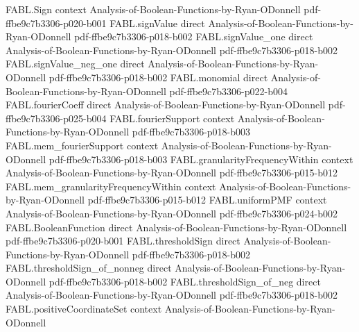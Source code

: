 \begin{theorem}
\label{FABL.coordinateResamplingNoisePMF_eq_coordinateNoisePMF}
\leanok
{}
\proofstep
  {FABL.Sign}
  {context}
  {Analysis-of-Boolean-Functions-by-Ryan-ODonnell}
  {pdf-ffbe9c7b3306-p020-b001}
\proofstep
  {FABL.signValue}
  {direct}
  {Analysis-of-Boolean-Functions-by-Ryan-ODonnell}
  {pdf-ffbe9c7b3306-p018-b002}
\proofstep
  {FABL.signValue_one}
  {direct}
  {Analysis-of-Boolean-Functions-by-Ryan-ODonnell}
  {pdf-ffbe9c7b3306-p018-b002}
\proofstep
  {FABL.signValue_neg_one}
  {direct}
  {Analysis-of-Boolean-Functions-by-Ryan-ODonnell}
  {pdf-ffbe9c7b3306-p018-b002}
\proofstep
  {FABL.monomial}
  {direct}
  {Analysis-of-Boolean-Functions-by-Ryan-ODonnell}
  {pdf-ffbe9c7b3306-p022-b004}
\proofstep
  {FABL.fourierCoeff}
  {direct}
  {Analysis-of-Boolean-Functions-by-Ryan-ODonnell}
  {pdf-ffbe9c7b3306-p025-b004}
\proofstep
  {FABL.fourierSupport}
  {context}
  {Analysis-of-Boolean-Functions-by-Ryan-ODonnell}
  {pdf-ffbe9c7b3306-p018-b003}
\proofstep
  {FABL.mem_fourierSupport}
  {context}
  {Analysis-of-Boolean-Functions-by-Ryan-ODonnell}
  {pdf-ffbe9c7b3306-p018-b003}
\proofstep
  {FABL.granularityFrequencyWithin}
  {context}
  {Analysis-of-Boolean-Functions-by-Ryan-ODonnell}
  {pdf-ffbe9c7b3306-p015-b012}
\proofstep
  {FABL.mem_granularityFrequencyWithin}
  {context}
  {Analysis-of-Boolean-Functions-by-Ryan-ODonnell}
  {pdf-ffbe9c7b3306-p015-b012}
\proofstep
  {FABL.uniformPMF}
  {context}
  {Analysis-of-Boolean-Functions-by-Ryan-ODonnell}
  {pdf-ffbe9c7b3306-p024-b002}
\proofstep
  {FABL.BooleanFunction}
  {direct}
  {Analysis-of-Boolean-Functions-by-Ryan-ODonnell}
  {pdf-ffbe9c7b3306-p020-b001}
\proofstep
  {FABL.thresholdSign}
  {direct}
  {Analysis-of-Boolean-Functions-by-Ryan-ODonnell}
  {pdf-ffbe9c7b3306-p018-b002}
\proofstep
  {FABL.thresholdSign_of_nonneg}
  {direct}
  {Analysis-of-Boolean-Functions-by-Ryan-ODonnell}
  {pdf-ffbe9c7b3306-p018-b002}
\proofstep
  {FABL.thresholdSign_of_neg}
  {direct}
  {Analysis-of-Boolean-Functions-by-Ryan-ODonnell}
  {pdf-ffbe9c7b3306-p018-b002}
\proofstep
  {FABL.positiveCoordinateSet}
  {context}
  {Analysis-of-Boolean-Functions-by-Ryan-ODonnell}

\end{theorem}
